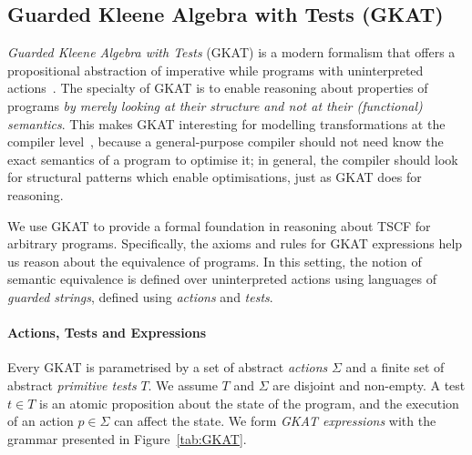 \subsection{Guarded Kleene Algebra with Tests (GKAT)}
\emph{Guarded Kleene Algebra with Tests} (GKAT) is a modern formalism that offers a propositional abstraction of imperative while programs with uninterpreted actions~\cite{GKAT}. The specialty of GKAT is to enable reasoning about properties of programs \emph{by merely looking at their structure and not at their (functional) semantics}. This makes GKAT interesting for modelling transformations at the compiler level~\cite{KATForCompilers}, because a general-purpose compiler should not need know the exact semantics of a program to optimise it; in general, the compiler should look for structural patterns which enable optimisations, just as GKAT does for reasoning. 

We use GKAT to provide a formal foundation in reasoning about TSCF for arbitrary programs. Specifically, the axioms and rules for GKAT 
expressions help us reason about the equivalence of programs. In this setting, the notion of 
semantic equivalence is defined over uninterpreted actions using languages of \emph{guarded strings}, defined using \emph{actions} and \emph{tests}. 

\paragraph*{Actions, Tests and Expressions}
Every GKAT is parametrised by a set of abstract \emph{actions} $\Sigma$ and a finite set of abstract \emph{primitive tests} $T$. We assume $T$ and $\Sigma$ are disjoint and non-empty. A test $t\in T$ is an atomic proposition about the state of the program, and the execution of an action $p \in \Sigma$ can affect the state. We form \emph{GKAT expressions} with the grammar presented in Figure~\ref{tab:GKAT}. 


